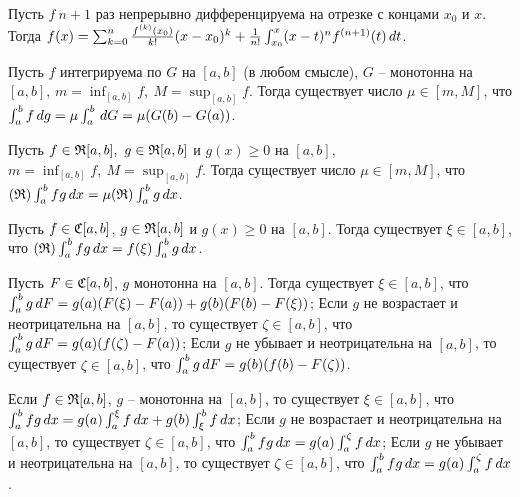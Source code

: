 \documentclass[unicode,10pt]{article}
\newcommand{\билет}[1]{\par\medskip\noindent{\large \textsf{Билет #1.}}\par}
\begin{document}
\begin{theorem} Пусть $f\ n+1$ раз непрерывно
дифференцируема на отрезке с концами $x_0$ и $x$. Тогда
$f(x)=\sum_{k=0}^n\frac{f^{(k)}(x_0)}{k!}(x-x_0)^k+\frac{1}{n!}\int_{x_0}^{x}(x-t)^nf^{(n+1)}(t)\,dt$.
\end{theorem}

\билет  {13}


\begin{theorem} Пусть $f$ интегрируема по $G$ на $[a,b]$ (в любом смысле), $G$ --
монотонна на $[a,b]$, $m=\inf_{[a,b]}f,\ M=\sup_{[a,b]}f$. Тогда существует число $\mu\in[m,M]$, что
$\int_{a}^{b}f\,dg=\mu\int_{a}^{b}\,dG=\mu(G(b)-G(a))$. \end{theorem}

\begin{imp} Пусть $f\in\mathfrak{R}[a,b],\ g\in\mathfrak{R}[a,b]$ и $g(x)\ge0$ на $[a,b]$, $m=\inf_{[a,b]}f,\ M=\sup_{[a,b]}f$. Тогда
существует число $\mu\in[m,M]$, что $(\mathfrak{R})\int_{a}^{b}fg\,dx=\mu(\mathfrak{R})\int_{a}^{b}g\,dx$. \end{imp}

\begin{imp} Пусть $f\in\mathfrak{C}[a,b]$, $g\in\mathfrak{R}[a,b]$  и $g(x)\ge0$ на $[a,b]$. Тогда существует $\xi\in[a,b]$, что
$(\mathfrak{R})\int_{a}^{b}fg\,dx=f(\xi)\int_{a}^{b}g\,dx$. \end{imp}

\begin{theorem} Пусть $F\in\mathfrak{C}[a,b]$, $g$ монотонна на $[a,b]$. Тогда существует
$\xi\in[a,b]$, что $\int_{a}^{b}g\,dF=g(a)(F(\xi)-F(a))+g(b)(F(b)-F(\xi))$; Если $g$ не возрастает и
неотрицательна на $[a,b]$, то существует $\zeta\in[a,b]$, что $\int_{a}^{b}g\,dF=g(a)(f(\zeta)-F(a))$; Если $g$
не убывает и неотрицательна на $[a,b]$, то существует $\zeta\in[a,b]$, что
$\int_{a}^{b}g\,dF=g(b)(f(b)-F(\zeta))$. \end{theorem}

\begin{imp} Если $f\in\mathfrak{R}[a,b]$, $g$ -- монотонна на $[a,b]$, то существует $\xi\in[a,b]$, что
$\int_{a}^{b}fg\,dx=g(a)\int_{a}^{\xi}f\,dx+g(b)\int_{\xi}^{b}f\,dx$; Если $g$ не возрастает и неотрицательна на $[a,b]$,
то существует $\zeta\in[a,b]$, что $\int_{a}^{b}fg\,dx=g(a)\int_{a}^{\zeta}f\,dx$; Если $g$ не убывает и неотрицательна
на $[a,b]$, то существует $\zeta\in[a,b]$, что $\int_{a}^{b}fg\,dx=g(a)\int_{a}^{\zeta}f\,dx$. \end{imp}


\билет  {14}
\end{document}
